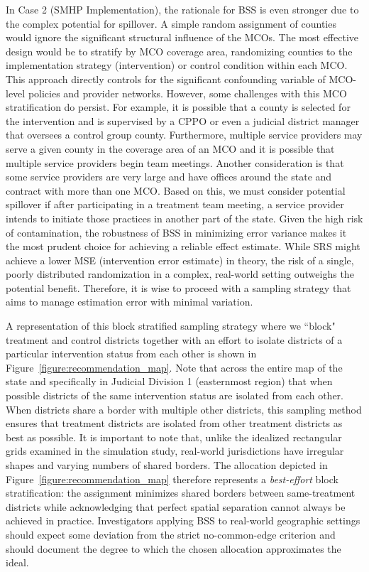 \documentclass{article}[11pt]
\begin{document}
In Case 2 (SMHP Implementation), the rationale for BSS is even stronger due to the complex potential for spillover. A simple random assignment of counties would ignore the significant structural influence of the MCOs. The most effective design would be to stratify by MCO coverage area, randomizing counties to the implementation strategy (intervention) or control condition within each MCO. This approach directly controls for the significant confounding variable of MCO-level policies and provider networks. However, some challenges with this MCO stratification do persist. For example, it is possible that a county is selected for the intervention and is supervised by a CPPO or even a judicial district manager that oversees a control group county. Furthermore, multiple service providers may serve a given county in the coverage area of an MCO and it is possible that multiple service providers begin team meetings. Another consideration is that some service providers are very large and have offices around the state and contract with more than one MCO. Based on this, we must consider potential spillover if after participating in a treatment team meeting, a service provider intends to initiate those practices in another part of the state. Given the high risk of contamination, the robustness of BSS in minimizing error variance makes it the most prudent choice for achieving a reliable effect estimate. While SRS might achieve a lower MSE (intervention error estimate) in theory, the risk of a single, poorly distributed randomization in a complex, real-world setting outweighs the potential benefit. Therefore, it is wise to proceed with a sampling strategy that aims to manage estimation error with minimal variation.

A representation of this block stratified sampling strategy where we ``block" treatment and control districts together with an effort to isolate districts of a particular intervention status from each other is shown in Figure~\ref{figure:recommendation_map}. Note that across the entire map of the state and specifically in Judicial Division 1 (easternmost region) that when possible districts of the same intervention status are isolated from each other. When districts share a border with multiple other districts, this sampling method ensures that treatment districts are isolated from other treatment districts as best as possible. It is important to note that, unlike the idealized rectangular grids examined in the simulation study, real-world jurisdictions have irregular shapes and varying numbers of shared borders. The allocation depicted in Figure~\ref{figure:recommendation_map} therefore represents a \textit{best-effort} block stratification: the assignment minimizes shared borders between same-treatment districts while acknowledging that perfect spatial separation cannot always be achieved in practice. Investigators applying BSS to real-world geographic settings should expect some deviation from the strict no-common-edge criterion and should document the degree to which the chosen allocation approximates the ideal.
\end{document}

